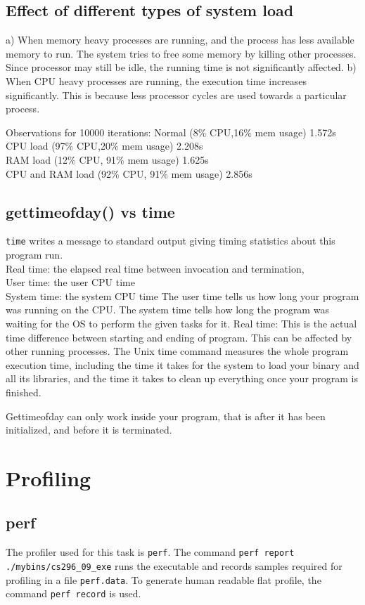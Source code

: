 \documentclass[11pt,english]{article}
\begin{document}
\subsection{Effect of different types of system load}
\indent \par{a) When memory heavy processes are running, and the process has less available memory to run. The system tries to free some memory by killing other processes. Since processor may still be idle, the running time is not significantly affected.
b) When CPU heavy processes are running, the execution time increases significantly. This is because less processor cycles are used towards a particular process.
}
\indent \par{Observations for 10000 iterations:} 
Normal (8\% CPU,16\% mem usage) 1.572s \\
CPU load (97\% CPU,20\% mem usage) 2.208s \\
RAM load (12\% CPU, 91\% mem usage) 1.625s \\
CPU and RAM load (92\% CPU, 91\% mem usage) 2.856s
\subsection{gettimeofday() vs time}
\indent \par{\verb+time+ writes a message to standard output giving timing statistics about this program run. \\
Real time: the elapsed real time between invocation and termination, \\
User time: the user CPU time \\
System time: the system CPU time}
The user time tells us how long your program was running on the CPU. The system time tells how long  the program was waiting for the OS to perform the given tasks for it. Real time: This is the actual time difference between starting and ending of program. This can be affected by other running processes. The Unix time command measures the whole program execution time, including the time it takes for the system to load your binary and all its libraries, and the time it takes to clean up everything once your program is finished. 
\indent \par{Gettimeofday can only work inside your program, that is after it has been initialized, and before it is terminated.}
\section{Profiling}
\subsection{perf}
\indent
\par{The profiler used for this task is \verb+perf+. The command \verb+perf report ./mybins/cs296_09_exe+ runs the executable and records samples required for profiling in a file \verb+perf.data+. To generate human readable flat profile, the command \verb+perf record+ is used.}
\end{document}
